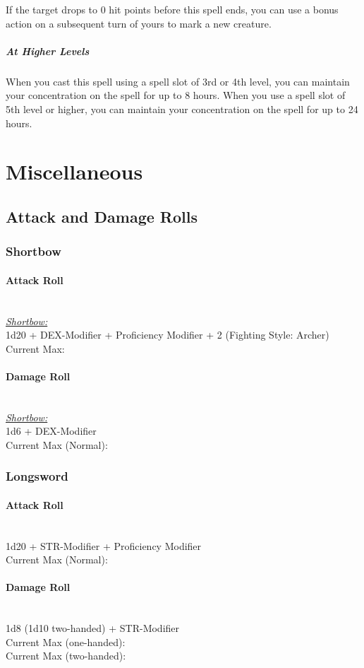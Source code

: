 {If the target drops to 0 hit points before this spell ends, you can use a bonus action on a subsequent turn of yours to mark a new creature.

\subparagraph*{At Higher Levels} When you cast this spell using a spell slot of 3rd or 4th level, you can maintain your concentration on the spell for up to 8 hours. When you use a spell slot of 5th level or higher, you can maintain your concentration on the spell for up to 24 hours.

\section*{Miscellaneous}
\subsection*{Attack and Damage Rolls}
\subsubsection*{Shortbow}
\paragraph*{Attack Roll}\hfill\\
\underline{\textit{Shortbow:}}\\
1d20 + DEX-Modifier + Proficiency Modifier + 2 (Fighting Style: Archer) \\
\indent Current Max:  \\
\paragraph*{Damage Roll}\hfill\\
\underline{\textit{Shortbow:}}\\
1d6 + DEX-Modifier\\
\indent Current Max (Normal):  \\
\subsubsection*{Longsword}
\paragraph*{Attack Roll}\hfill\\
1d20 + STR-Modifier + Proficiency Modifier \\
\indent Current Max (Normal): 
\paragraph*{Damage Roll}\hfill\\
1d8 (1d10 two-handed) + STR-Modifier\\
\indent Current Max (one-handed): \\
\indent Current Max (two-handed): \\
}